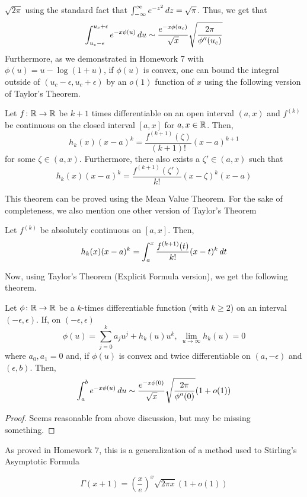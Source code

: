 \documentclass[11pt,leqno,oneside]{amsbook}
\numberwithin{thm}{section}
\begin{document}
\(\sqrt{2\pi}\) using the standard fact that \(\int_{-\infty}^\infty
e^{-z^2} \, d z = \sqrt{\pi}\). Thus, we get that \[
  \int_{u_c-\epsilon}^{u_c+\epsilon} e^{-x \phi(u)} \, d u \sim
  \frac{e^{-x \phi(u_c)}}{\sqrt{x}} \sqrt{\frac{2\pi}{\phi''(u_c)}}
\]
Furthermore, as we demonstrated in Homework 7 with \(\phi(u) =
u-\log(1+u)\), if \(\phi(u)\) is convex, one can bound the integral outside of
\((u_c-\epsilon,u_c+\epsilon)\) by an \(o(1)\) function of \(x\) using
the following version of Taylor's Theorem.
\begin{thm}
  Let \(f \colon {\mathbb R} \to {\mathbb R}\) be \(k+1\) times differentiable on an
  open interval \((a,x)\) and \(f^{(k)}\) be continuous on the closed
  interval \([a,x]\) for \(a,x \in {\mathbb R}\). Then, \[
    h_k(x)(x-a)^k = \frac{f^{(k+1)}(\zeta)}{(k+1)!}(x-a)^{k+1}
  \]
  for some \(\zeta \in (a,x)\). Furthermore, there also exists a
  \(\zeta' \in (a,x)\) such that \[
    h_k(x)(x-a)^k = \frac{f^{(k+1)}(\zeta')}{k!}(x-\zeta)^k(x-a)
  \]
\end{thm}
This theorem can be proved using the Mean Value Theorem. For the sake
of completeness, we also mention one other version of Taylor's Theorem
\begin{thm}
  Let \(f^{(k)}\) be absolutely continuous on \([a,x]\). Then, \[
    h_k(x)(x-a)^k = \int_a^x \frac{f^{(k+1)}(t)}{k!} (x-t)^k \, d t
  \]
\end{thm}
Now, using Taylor's Theorem (Explicit Formula version), we get
the following theorem.
\begin{thm}
  Let \(\phi \colon {\mathbb R} \to {\mathbb R}\) be a \(k\)-times differentiable
   function (with \(k \geq 2\)) on an interval
   \((-\epsilon,\epsilon)\). If, on \((-\epsilon,\epsilon)\) 
  \[
    \phi(u) = \sum_{j=0}^k a_j u^j + h_k(u) u^k, \ \lim_{u \to \infty}
    h_k(u) = 0
  \]
  where \(a_0,a_1 = 0\) and, if \(\phi(u)\) is convex and twice differentiable on \((a,-\epsilon)\)
  and \((\epsilon,b)\). Then, \[
    \int_{a}^b e^{-x \phi(u)} \, d u \sim \frac{e^{-x
        \phi(0)}}{\sqrt{x}} \sqrt{\frac{2\pi}{\phi''(0)}} (1+o(1))
  \]
\end{thm}
\begin{proof}
  Seems reasonable from above discussion, but may be missing something.
\end{proof}
As proved in Homework 7, this is a generalization of a method used
to Stirling's
Asymptotic Formula
\begin{cor}
\[  \Gamma(x+1) = \left( \frac{x}{e} \right)^x \sqrt{2\pi x}(1+o(1))\]
\end{cor}
\end{document}
